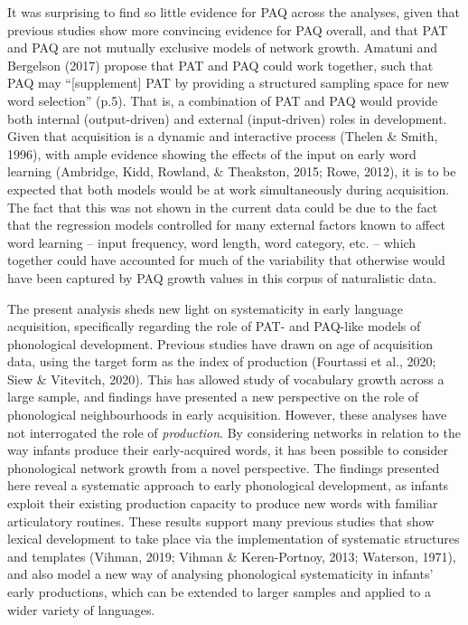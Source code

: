 \documentclass[
  man,mask,floatsintext]{apa6}
\begin{document}
It was surprising to find so little evidence for PAQ across the analyses, given that previous studies show more convincing evidence for PAQ overall, and that PAT and PAQ are not mutually exclusive models of network growth. Amatuni and Bergelson (2017) propose that PAT and PAQ could work together, such that PAQ may ``{[}supplement{]} PAT by providing a structured sampling space for new word selection'' (p.5). That is, a combination of PAT and PAQ would provide both internal (output-driven) and external (input-driven) roles in development. Given that acquisition is a dynamic and interactive process (Thelen \& Smith, 1996), with ample evidence showing the effects of the input on early word learning (Ambridge, Kidd, Rowland, \& Theakston, 2015; Rowe, 2012), it is to be expected that both models would be at work simultaneously during acquisition. The fact that this was not shown in the current data could be due to the fact that the regression models controlled for many external factors known to affect word learning -- input frequency, word length, word category, etc. -- which together could have accounted for much of the variability that otherwise would have been captured by PAQ growth values in this corpus of naturalistic data.

The present analysis sheds new light on systematicity in early language acquisition, specifically regarding the role of PAT- and PAQ-like models of phonological development. Previous studies have drawn on age of acquisition data, using the target form as the index of production (Fourtassi et al., 2020; Siew \& Vitevitch, 2020). This has allowed study of vocabulary growth across a large sample, and findings have presented a new perspective on the role of phonological neighbourhoods in early acquisition. However, these analyses have not interrogated the role of \emph{production}. By considering networks in relation to the way infants produce their early-acquired words, it has been possible to consider phonological network growth from a novel perspective. The findings presented here reveal a systematic approach to early phonological development, as infants exploit their existing production capacity to produce new words with familiar articulatory routines. These results support many previous studies that show lexical development to take place via the implementation of systematic structures and templates (Vihman, 2019; Vihman \& Keren-Portnoy, 2013; Waterson, 1971), and also model a new way of analysing phonological systematicity in infants' early productions, which can be extended to larger samples and applied to a wider variety of languages.
\end{document}
